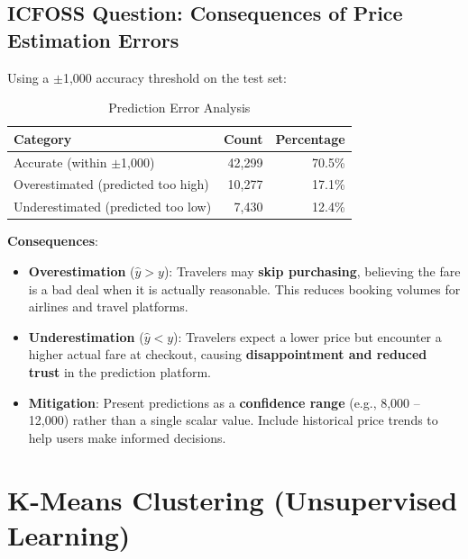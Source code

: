 \documentclass[12pt, a4paper]{article}
\newcommand{\rupee}{\text{₹}}
\begin{document}
\subsection{ICFOSS Question: Consequences of Price Estimation Errors}

Using a $\pm$\rupee1,000 accuracy threshold on the test set:

\begin{table}[H]
\centering
\caption{Prediction Error Analysis}
\begin{tabular}{l r r}
\toprule
\textbf{Category} & \textbf{Count} & \textbf{Percentage} \\
\midrule
Accurate (within $\pm$\rupee1,000) & 42,299 & 70.5\% \\
Overestimated (predicted too high) & 10,277 & 17.1\% \\
Underestimated (predicted too low) & 7,430  & 12.4\% \\
\bottomrule
\end{tabular}
\end{table}

\begin{importantbox}
\textbf{Consequences}:
\begin{itemize}
    \item \textbf{Overestimation} ($\hat{y} > y$): Travelers may \textbf{skip purchasing}, believing the fare is a bad deal when it is actually reasonable. This reduces booking volumes for airlines and travel platforms.
    
    \item \textbf{Underestimation} ($\hat{y} < y$): Travelers expect a lower price but encounter a higher actual fare at checkout, causing \textbf{disappointment and reduced trust} in the prediction platform.
    
    \item \textbf{Mitigation}: Present predictions as a \textbf{confidence range} (e.g., \rupee8,000 -- \rupee12,000) rather than a single scalar value. Include historical price trends to help users make informed decisions.
\end{itemize}
\end{importantbox}

\newpage

\section{K-Means Clustering (Unsupervised Learning)}
\end{document}
